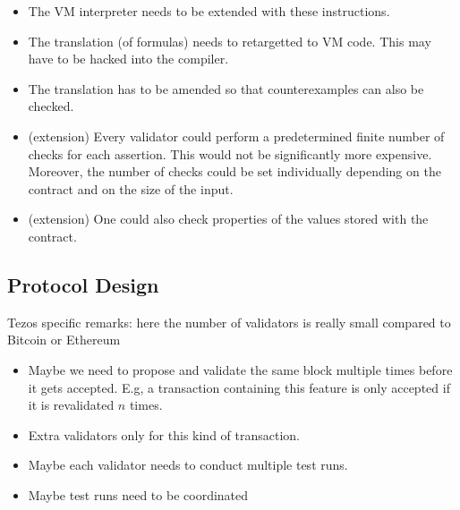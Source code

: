 \documentclass{article}
\newenvironment{changethis}{%
  \begin{tcolorbox}[breakable,notitle,boxrule=0pt,colback=blue!20,colframe=blue!20]}{%
  \end{tcolorbox}}
\begin{document}
\begin{itemize}
\item The VM interpreter needs to be extended with these instructions.
\item The translation (of formulas) needs to retargetted to VM code. This may have to
  be hacked into the compiler.
\item The translation has to be amended so that counterexamples can also be checked.
\item (extension) Every validator could perform a predetermined finite number of checks for each
  assertion. This would not be significantly more expensive. Moreover, the number of
  checks could be set individually depending on the contract and on the size of the
  input.
\item (extension) One could also check properties of the values stored with the contract.
\end{itemize}
\subsection{Protocol Design}
\label{sec:protocol-design}

\begin{changethis}
  Tezos specific remarks: here the number of validators is really small compared to
  Bitcoin or Ethereum
  \begin{itemize}
  \item Maybe we need to propose and validate the same block multiple times before it
    gets accepted. E.g, a transaction containing this feature is only accepted if it is
    revalidated $n$ times.
  \item Extra validators only for this kind of transaction.
  \item Maybe each validator needs to conduct multiple test runs.
  \item Maybe test runs need to be coordinated
  \end{itemize}
\end{changethis}
\end{document}
